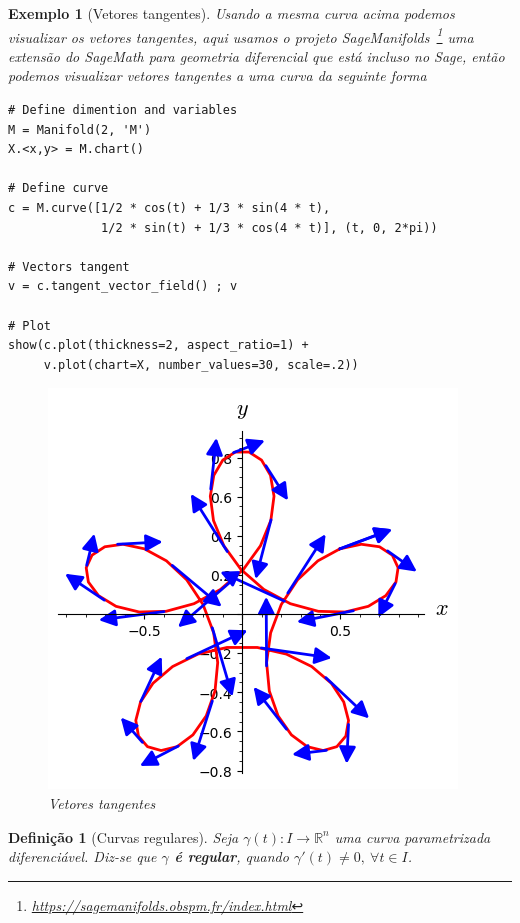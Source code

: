 \documentclass[12pt]{article}
\newtheorem{ex}{Exemplo}[section]
\newtheorem{definition}{Definição}
\newcommand{\furl}[1]{\footnote{\url{#1}}}
\begin{document}
\begin{ex}[Vetores tangentes] Usando a mesma curva acima podemos visualizar os vetores tangentes, aqui usamos o projeto \textit{SageManifolds}~\furl{https://sagemanifolds.obspm.fr/index.html} uma extensão do \textit{SageMath} para geometria diferencial que está incluso no Sage, então podemos visualizar vetores tangentes a uma curva da seguinte forma
\begin{lstlisting}
# Define dimention and variables
M = Manifold(2, 'M')
X.<x,y> = M.chart()

# Define curve
c = M.curve([1/2 * cos(t) + 1/3 * sin(4 * t), 
             1/2 * sin(t) + 1/3 * cos(4 * t)], (t, 0, 2*pi))

# Vectors tangent
v = c.tangent_vector_field() ; v

# Plot
show(c.plot(thickness=2, aspect_ratio=1) +
     v.plot(chart=X, number_values=30, scale=.2))
\end{lstlisting}

\begin{figure}[H]
    \centering
    \includegraphics[scale=.6]{Images/ex1.2.png}
    \caption{Vetores tangentes}
    \label{fig:ex1.2}
\end{figure}

\end{ex}

\begin{definition}[Curvas regulares]
Seja $\gamma (t): I \rightarrow \mathbb{R}^n$ uma curva parametrizada diferenciável. Diz-se que \textbf{$\gamma$ é regular}, quando $\gamma'(t) \neq 0,\ \forall t \in I$.
\end{definition}
\end{document}
